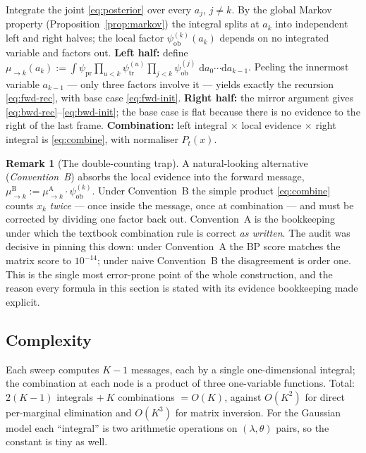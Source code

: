\documentclass[11pt]{article}
\theoremstyle{definition}
\newtheorem{remark}{Remark}
\newcommand{\dd}{\mathrm{d}}
\begin{document}
\begin{derivation}
Integrate the joint \eqref{eq:posterior} over every $a_j$, $j\ne k$. By the
global Markov property (Proposition~\ref{prop:markov}) the integral splits at
$a_k$ into independent left and right halves; the local factor
$\psi^{(k)}_{\mathrm{ob}}(a_k)$ depends on no integrated variable and factors
out. \textbf{Left half:} define
$\mu_{\to k}(a_k):=\int\psi_{\mathrm{pr}}\prod_{u<k}\psi^{(u)}_{\mathrm{tr}}
\prod_{j<k}\psi^{(j)}_{\mathrm{ob}}\;\dd a_0\cdots\dd a_{k-1}$. Peeling the
innermost variable $a_{k-1}$ --- only three factors involve it --- yields
exactly the recursion \eqref{eq:fwd-rec}, with base case
\eqref{eq:fwd-init}. \textbf{Right half:} the mirror argument gives
\eqref{eq:bwd-rec}--\eqref{eq:bwd-init}; the base case is flat because there
is no evidence to the right of the last frame. \textbf{Combination:} left
integral $\times$ local evidence $\times$ right integral is
\eqref{eq:combine}, with normaliser $P_t(x)$.
\end{derivation}

\begin{remark}[The double-counting trap]\label{rmk:trap}
A natural-looking alternative (\emph{Convention~B}) absorbs the local
evidence into the forward message,
$\mu^{\mathrm B}_{\to k}:=\mu^{\mathrm A}_{\to k}\cdot\psi^{(k)}_{\mathrm{ob}}$.
Under Convention~B the simple product \eqref{eq:combine} counts $x_k$
\emph{twice} --- once inside the message, once at combination --- and must be
corrected by dividing one factor back out. Convention~A is the bookkeeping
under which the textbook combination rule is correct \emph{as written}. The
audit was decisive in pinning this down: under Convention~A the BP score
matches the matrix score to $10^{-14}$; under naive Convention~B the
disagreement is order one. This is the single most error-prone point of the
whole construction, and the reason every formula in this section is stated
with its evidence bookkeeping made explicit.
\end{remark}

\subsection{Complexity}

Each sweep computes $K-1$ messages, each by a single one-dimensional integral;
the combination at each node is a product of three one-variable functions.
Total: $2(K-1)$ integrals $+\ K$ combinations $=O(K)$, against $O(K^2)$ for
direct per-marginal elimination and $O(K^3)$ for matrix inversion. For the
Gaussian model each ``integral'' is two arithmetic operations on
$(\lambda,\theta)$ pairs, so the constant is tiny as well.
\end{document}
